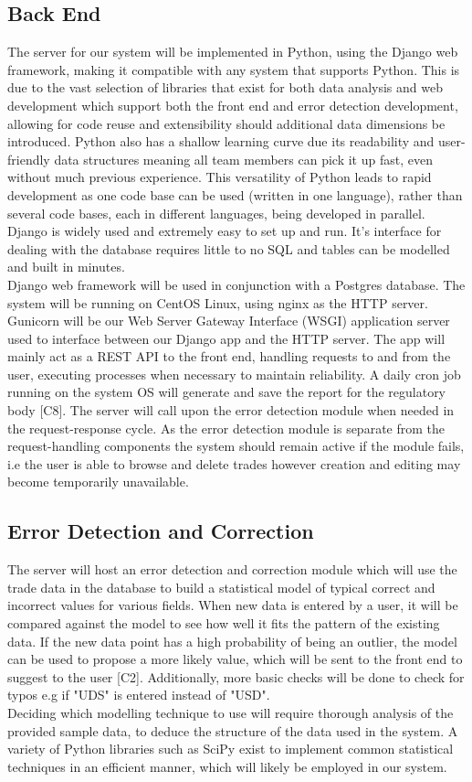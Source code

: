 \documentclass{article}
\begin{document}
\subsection*{Back End}
The server for our system will be implemented in Python, using the Django web framework, making it compatible with any system that supports Python. This is due to the vast selection of libraries that exist for both data analysis and web development which support both the front end and error detection development, allowing for code reuse and
extensibility should additional data dimensions be introduced. Python also has a shallow learning curve due its readability and user-friendly data structures meaning all team members can pick it up fast, even without much previous experience. This versatility of Python leads to rapid development as one code base can be used (written in one language), rather than several code bases, each in different languages, being developed in parallel. Django is widely used and extremely easy to set up and run. It’s interface for dealing with the database requires little to no SQL and tables can be modelled and built in minutes. 
\\
Django web framework will be used in conjunction with a Postgres database. The system will be running on CentOS Linux, using nginx as the HTTP server. Gunicorn will be our Web Server Gateway Interface (WSGI) application server used to interface between our Django app and the HTTP server. The app will mainly act as a REST API to the front end, handling requests to and from the user, executing processes when necessary to maintain reliability. A daily cron job 
running on the system OS will generate and save the report for the regulatory body [C8]. The server will call upon the error detection module when needed in the request-response cycle. As the
error detection module is separate from the request-handling components the system should remain
active if the module fails, i.e the user is able to browse and delete trades however creation and
editing may become temporarily unavailable.

\subsection*{Error Detection and Correction}
The server will host an error detection and correction module which will use the trade data in the database to build a statistical model of typical correct and incorrect values for various fields. When new data is entered by a user, it will be compared against the model to see how well it fits the pattern of the existing data. If the new data point has a high probability of being an outlier, the model can be used to propose a more likely value, which will be sent to the front end to suggest to the user [C2]. Additionally, more basic checks will
be done to check for typos e.g if "UDS" is entered instead of "USD".
\\
Deciding which modelling technique to use will require thorough analysis of the provided sample data, to deduce the structure of the data used in the system. A variety of Python libraries such as SciPy exist to implement common statistical techniques in an efficient manner, which will likely be employed in our system. 
\end{document}
